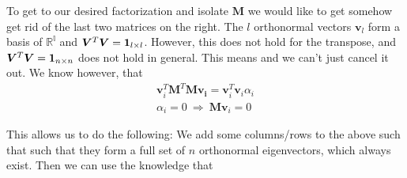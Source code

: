 To get to our desired factorization and isolate $\bm{M}$ we would like to get somehow get rid of the last two matrices on the right.
The $l$ orthonormal vectors $\bm{v}_l$ form a basis of $\mathbb{R^l}$ and $\bm{V}^T \bm{V} = \bm{1}_{l \times l}$.
However, this does not hold for the transpose, and $\bm{V}^T \bm{V} = \bm{1}_{n \times n}$ does not hold in general. This means
and we can't just cancel it out. We know however, that 
\begin{align}
    \bm{v}_i^T \bm{M}^T \bm{M} \bm{v_i} =  \bm{v}_i^T \bm{v}_i \alpha_i \\
    \alpha_i = 0 \ \Rightarrow \ \bm{Mv}_i = 0
\end{align}
\allowdisplaybreaks

This allows us to do the following: We add some columns/rows to the above such that such that they form 
a full set of $n$ orthonormal eigenvectors, which always exist. Then we 
can use the knowledge that 
